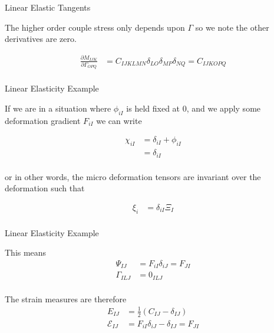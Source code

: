 \documentclass[11pt]{beamer}
\begin{document}
\begin{frame}{Linear Elastic Tangents}

The higher order couple stress only depends upon $\Gamma$ so we note the other derivatives are zero.

\begin{align*}
\frac{\partial M_{IJK}}{\partial \Gamma_{OPQ}} &= C_{IJKLMN} \delta_{LO} \delta_{MP} \delta_{NQ} = C_{IJKOPQ}\\
\end{align*}

\end{frame}

\begin{frame}{Linear Elasticity Example}

If we are in a situation where $\phi_{iI}$ is held fixed at 0, and we apply some deformation gradient $F_{iI}$ we can write

\begin{align*}
\chi_{iI} &= \delta_{iI} + \phi_{iI}\\
&= \delta_{iI}\\
\end{align*}

or in other words, the micro deformation tensors are invariant over the deformation such that

\begin{align*}
\xi_{i} &= \delta_{iI} \Xi_{I}\\
\end{align*}

\end{frame}

\begin{frame}{Linear Elasticity Example}

This means
\begin{align*}
\Psi_{IJ} &= F_{iI} \delta_{iJ} = F_{JI}\\
\Gamma_{ILJ} &= 0_{ILJ}\\
\end{align*}

The strain measures are therefore
\begin{align*}
E_{IJ} &= \frac{1}{2} \left(C_{IJ} - \delta_{IJ}\right)\\
\mathcal{E}_{IJ} &= F_{iI} \delta_{iJ} - \delta_{IJ} = F_{JI}\\
\end{align*}

\end{frame}
\end{document}
